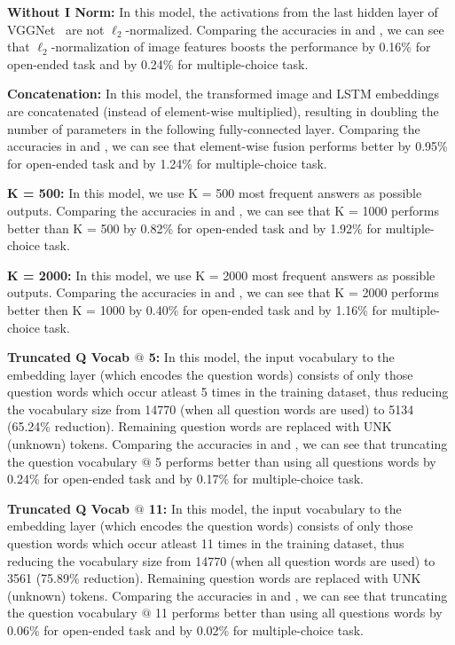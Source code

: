 \begin{compactenum}
\item \textbf{Without I Norm:} In this model, the activations from the last hidden layer of VGGNet~\cite{Simonyan14c} are not $\ell_2$-normalized. Comparing the accuracies in  and , we can see that $\ell_2$-normalization of image features boosts the performance by 0.16\% for open-ended task and by 0.24\% for multiple-choice task. 

\item \textbf{Concatenation:} In this model, the transformed image and LSTM embeddings are concatenated (instead of element-wise multiplied), resulting in doubling the number of parameters in the following fully-connected layer. Comparing the accuracies in  and , we can see that element-wise fusion performs better by 0.95\% for open-ended task and by 1.24\% for multiple-choice task.

\item \textbf{K = 500:} In this model, we use K = 500 most frequent answers as possible outputs. Comparing the accuracies in  and , we can see that K = 1000 performs better than K = 500 by 0.82\% for open-ended task and by 1.92\% for multiple-choice task.

\item \textbf{K = 2000:} In this model, we use K = 2000 most frequent answers as possible outputs. Comparing the accuracies in  and , we can see that K = 2000 performs better then K = 1000 by 0.40\% for open-ended task and by 1.16\% for multiple-choice task.

\item \textbf{Truncated Q Vocab $@$ 5:} In this model, the input vocabulary to the embedding layer (which encodes the question words) consists of only those question words which occur atleast 5 times in the training dataset, thus reducing the vocabulary size from 14770 (when all question words are used) to 5134 (65.24\% reduction). Remaining question words are replaced with UNK (unknown) tokens. Comparing the accuracies in  and , we can see that truncating the question vocabulary $@$ 5 performs better than using all questions words by 0.24\% for open-ended task and by 0.17\% for multiple-choice task.

\item \textbf{Truncated Q Vocab $@$ 11:} In this model, the input vocabulary to the embedding layer (which encodes the question words) consists of only those question words which occur atleast 11 times in the training dataset, thus reducing the vocabulary size from 14770 (when all question words are used) to 3561 (75.89\% reduction). Remaining question words are replaced with UNK (unknown) tokens. Comparing the accuracies in  and , we can see that truncating the question vocabulary $@$ 11 performs better than using all questions words by 0.06\% for open-ended task and by 0.02\% for multiple-choice task.


\end{compactenum}
